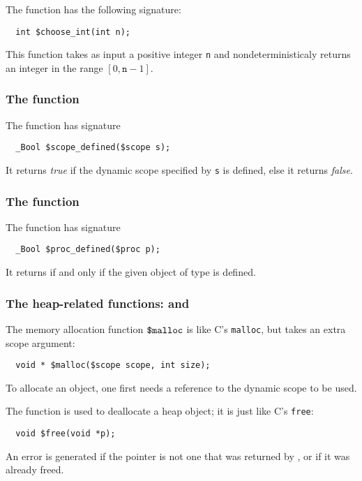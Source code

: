 The function \cchooseint{} has the following signature:
\begin{verbatim}
  int $choose_int(int n);
\end{verbatim}
This function takes as input a positive integer \texttt{n} and
nondeterministicaly returns an integer in the range
$[0,\texttt{n}-1]$.

\subsubsection{The \cscopedefined{} function}
\label{subsubsec:scopedefined}

The function \cscopedefined{} has signature
\begin{verbatim}
  _Bool $scope_defined($scope s);
\end{verbatim}
It returns \emph{true} if the dynamic scope specified by \texttt{s} is
defined, else it returns \emph{false}.

\subsubsection{The \cprocdefined{} function}
\label{subsubsec:procdefined}

The function \cprocdefined{} has signature
\begin{verbatim}
  _Bool $proc_defined($proc p);
\end{verbatim}

It returns \ctrue if and only if the given object of \cproc{} type is defined.


\subsubsection{The heap-related functions: \cmalloc{} and \cfree}
\label{subsubsec:mallocandfree}

The memory allocation function $\mbox{\texttt{\${}malloc}}$ is like C's \texttt{malloc}, but takes
an extra scope argument:
\begin{verbatim}
  void * $malloc($scope scope, int size);
\end{verbatim}
To allocate an object, one first needs a reference to the dynamic scope to be used.

The function \cfree{} is used to deallocate a heap object;
it is just like C's \texttt{free}:
\begin{verbatim}
  void $free(void *p);
\end{verbatim}
An error is generated if the pointer is not one that was returned by
\cmalloc, or if it was already freed.

